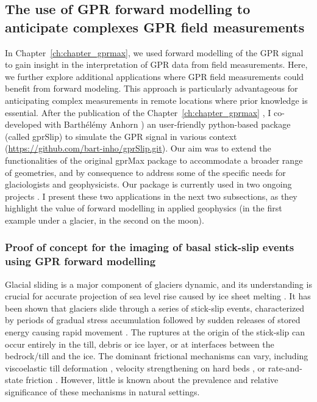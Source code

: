 \subsection{The use of GPR forward modelling to anticipate complexes GPR field measurements}

In Chapter~\ref{ch:chapter_gprmax}, we used forward modelling of the GPR signal to gain insight in the interpretation of GPR data from field measurements. Here, we further explore additional applications where GPR field measurements could benefit from forward modeling. This approach is particularly advantageous for anticipating complex measurements in remote locations where prior knowledge is essential. After the publication of the Chapter~\ref{ch:chapter_gprmax} \citep{Ogier&al2023}, I co-developed with Barthélémy Anhorn \citep[as part of his master thesis at ETHZ, see][]{Anhorn2024}) an user-friendly python-based package (called gprSlip) to simulate the GPR signal in various context (\url{https://github.com/bart-inho/gprSlip.git}). Our aim was to extend the functionalities of the original gprMax package \citep{Warren&al2016} to accommodate a broader range of geometries, and by consequence to address some of the specific needs for glaciologists and geophysicists. Our package is currently used in two ongoing projects \citep{Aichele&al2024,Mittelholz&al2024}. I present these two applications in the next two subsections, as they highlight the value of forward modelling in applied geophysics (in the first example under a glacier, in the second on the moon). 

\subsubsection{Proof of concept for the imaging of basal stick-slip events using GPR forward modelling}
 
Glacial sliding is a major component of glaciers dynamic, and its understanding is crucial for accurate projection of sea level rise caused by ice sheet melting \citep{Ritz&al2015}. It has been shown that glaciers slide through a series of stick-slip events, characterized by periods of gradual stress accumulation followed by sudden releases of stored energy causing rapid movement \citep{Walter&al2011,Podolskiy&al2016,Grab&al2021}. The ruptures at the origin of the stick-slip can occur entirely in the till, debris or ice layer, or at interfaces between the bedrock/till and the ice. The dominant frictional mechanisms can vary, including viscoelastic till deformation \citep{Tulaczyk&al1999}, velocity strengthening on hard beds \citep{Guerin&al2021}, or rate-and-state friction \citep{Zoet&al2020}. However, little is known about the prevalence and relative significance of these mechanisms in natural settings. 

